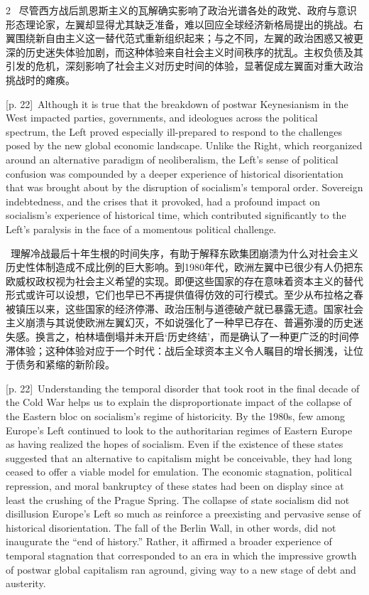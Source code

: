 \documentclass[10pt,a4paper]{article}
\begin{document}
\begin{paracol}{2}
\switchcolumn*
{\scriptsize\color{gray} [p. 22]}\ 尽管西方战后凯恩斯主义的瓦解确实影响了政治光谱各处的政党、政府与意识形态理论家，左翼却显得尤其缺乏准备，难以回应全球经济新格局提出的挑战。右翼围绕新自由主义这一替代范式重新组织起来；与之不同，左翼的政治困惑又被更深的历史迷失体验加剧，而这种体验来自社会主义时间秩序的扰乱。主权负债及其引发的危机，深刻影响了社会主义对历史时间的体验，显著促成左翼面对重大政治挑战时的瘫痪。\par
\switchcolumn
{\scriptsize\color{gray} [p. 22]}\ Although it is true that the breakdown of postwar Keynesianism in the West impacted parties, governments, and ideologues across the political spectrum, the Left proved especially ill-prepared to respond to the challenges posed by the new global economic landscape. Unlike the Right, which reorganized around an alternative paradigm of neoliberalism, the Left’s sense of political confusion was compounded by a deeper experience of historical disorientation that was brought about by the disruption of socialism’s temporal order. Sovereign indebtedness, and the crises that it provoked, had a profound impact on socialism’s experience of historical time, which contributed significantly to the Left’s paralysis in the face of a momentous political challenge.\par
\switchcolumn*
{\scriptsize\color{gray} [p. 22]}\ 理解冷战最后十年生根的时间失序，有助于解释东欧集团崩溃为什么对社会主义历史性体制造成不成比例的巨大影响。到1980年代，欧洲左翼中已很少有人仍把东欧威权政权视为社会主义希望的实现。即便这些国家的存在意味着资本主义的替代形式或许可以设想，它们也早已不再提供值得仿效的可行模式。至少从布拉格之春被镇压以来，这些国家的经济停滞、政治压制与道德破产就已暴露无遗。国家社会主义崩溃与其说使欧洲左翼幻灭，不如说强化了一种早已存在、普遍弥漫的历史迷失感。换言之，柏林墙倒塌并未开启‘历史终结’，而是确认了一种更广泛的时间停滞体验；这种体验对应于一个时代：战后全球资本主义令人瞩目的增长搁浅，让位于债务和紧缩的新阶段。\par
\switchcolumn
{\scriptsize\color{gray} [p. 22]}\ Understanding the temporal disorder that took root in the final decade of the Cold War helps us to explain the disproportionate impact of the collapse of the Eastern bloc on socialism’s regime of historicity. By the 1980s, few among Europe’s Left continued to look to the authoritarian regimes of Eastern Europe as having realized the hopes of socialism. Even if the existence of these states suggested that an alternative to capitalism might be conceivable, they had long ceased to offer a viable model for emulation. The economic stagnation, political repression, and moral bankruptcy of these states had been on display since at least the crushing of the Prague Spring. The collapse of state socialism did not disillusion Europe’s Left so much as reinforce a preexisting and pervasive sense of historical disorientation. The fall of the Berlin Wall, in other words, did not inaugurate the “end of history.” Rather, it affirmed a broader experience of temporal stagnation that corresponded to an era in which the impressive growth of postwar global capitalism ran aground, giving way to a new stage of debt and austerity.\par
\switchcolumn*
\end{paracol}
\end{document}
